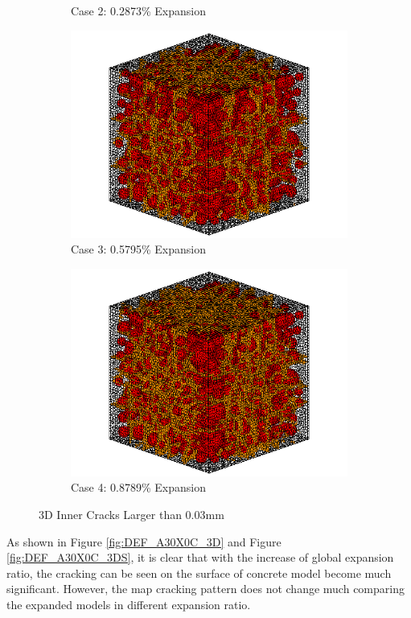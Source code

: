 \begin{figure}[!h]
\begin{subfigure}{.5\textwidth}
    \caption{Case 2: 0.2873\% Expansion}
    \end{subfigure}%
    \begin{subfigure}{.5\textwidth}
      \centering
      \includegraphics[width=.8\linewidth]{Files/exp_3D/DEF/A30X0C_3_c.png}
    \caption{Case 3: 0.5795\% Expansion}
    \end{subfigure}
    \begin{subfigure}{.5\textwidth}
      \centering
      \includegraphics[width=.8\linewidth]{Files/exp_3D/DEF/A30X0C_4_c.png}
    \caption{Case 4: 0.8789\% Expansion}
    \end{subfigure}%

  \caption{3D Inner Cracks Larger than 0.03mm}
  \label{fig:DEF_A30X0C_crack}
\end{figure}

As shown in Figure \ref{fig:DEF_A30X0C_3D} and Figure \ref{fig:DEF_A30X0C_3DS}, it is clear that with the increase of global expansion ratio, the cracking can be seen on the surface of concrete model become much significant. However, the map cracking pattern does not change much comparing the expanded models in different expansion ratio.

